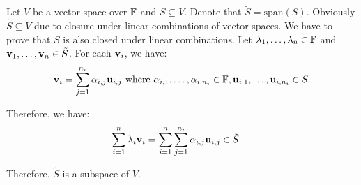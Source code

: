 \begin{proof*}
	Let $V$ be a vector space over $\mathbb{F}$ and $S\subseteq V$. Denote that $\tilde S = \mathrm{span}(S)$. Obviously $\tilde S \subseteq V$ due to closure under linear combinations of vector spaces. We have to prove that $\tilde S$ is also closed under linear combinations. Let $\lambda_1, \dots, \lambda_n\in\mathbb{F}$ and ${\bf v}_1, \dots, {\bf v}_n\in \tilde S$. For each ${\bf v}_i$, we have:
	\begin{align*}
		{\bf v}_i = \sum_{j=1}^{n_i} \alpha_{i, j} {\bf u}_{i,j} \text{ where } \alpha_{i,1}, \dots, \alpha_{i, n_i} \in \mathbb{F}, {\bf u}_{i,1}, \dots, {\bf u}_{i,n_i} \in S.
	\end{align*} 

	\noindent Therefore, we have:
	\begin{align*}
		\sum_{i=1}^n \lambda_i {\bf v}_i &= \sum_{i=1}^n \sum_{j=1}^{n_i} \alpha_{i, j}{\bf u}_{i, j} \in \tilde S.
	\end{align*} 

	\noindent Therefore, $\tilde S$ is a subspace of $V$.
\end{proof*}	 